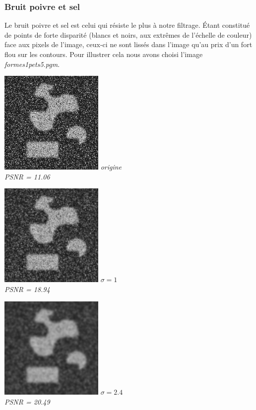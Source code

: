\documentclass[a4,12pt]{article}
\begin{document}
\subsubsection*{Bruit poivre et sel}
Le bruit poivre et sel est celui qui résiste le plus à notre filtrage. Étant constitué de points de forte disparité (blancs et noirs, aux extrêmes de l'échelle de couleur) face aux pixels de l'image, ceux-ci ne sont lissés dans l'image qu'au prix d'un fort flou sur les contours. Pour illustrer cela nous avons choisi l'image \textit{formes1pets5.pgm}.
\begin{center}
	\begin{minipage}[c]{0.30\linewidth}
		\begin{center}
			\includegraphics[width = 50mm]{./img/1pets5.jpg}
			\textit{origine}\\
			\textit{PSNR = 11.06}
		\end{center}
	\end{minipage}
	\begin{minipage}[c]{0.30\linewidth}
		\begin{center}
			\includegraphics[width = 50mm]{./img/1pets5-1.jpg}
			\textit{$\sigma = 1$}\\
			\textit{PSNR = 18.94}
		\end{center}
	\end{minipage}
	\begin{minipage}[c]{0.30\linewidth}
		\begin{center}
			\includegraphics[width = 50mm]{./img/1pets5-2_4.jpg}
			\textit{$\sigma = 2.4$}\\
			\textit{PSNR = 20.49}
		\end{center}
	\end{minipage}
\end{center}
\end{document}

